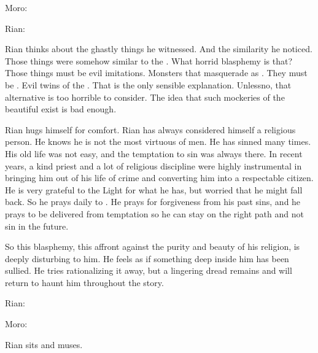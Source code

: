 Moro:

Rian:

Rian thinks about the ghastly things he witnessed. 
And the similarity he noticed. 
Those things were somehow similar to the \sephiroth.
What horrid blasphemy is that?
Those things must be evil imitations. 
Monsters that masquerade as \sephiroth.
They must be \qliphoth.
Evil twins of the \sephiroth.
That is the only sensible explanation.
Unless\prikker no, that alternative is too horrible to consider. 
The idea that such mockeries of the beautiful \sephiroth exist is bad enough. 

Rian hugs himself for comfort. 
Rian has always considered himself a religious person. 
He knows he is not the most virtuous of men. 
He has sinned many times. 
His old life was not easy, and the temptation to sin was always there. 
In recent years, a kind priest and a lot of religious discipline were highly instrumental in bringing him out of his life of crime and converting him into a respectable citizen. 
He is very grateful to the Light for what he has, but worried that he might fall back. 
So he prays daily to \iquin.
He prays for forgiveness from his past sins, and he prays to be delivered from temptation so he can stay on the right path and not sin in the future. 

So this blasphemy, this affront against the purity and beauty of his religion, is deeply disturbing to him. 
He feels as if something deep inside him has been sullied. 
He tries rationalizing it away, but a lingering dread remains and will return to haunt him throughout the story. 

Rian:

Moro: 

Rian sits and muses. 











